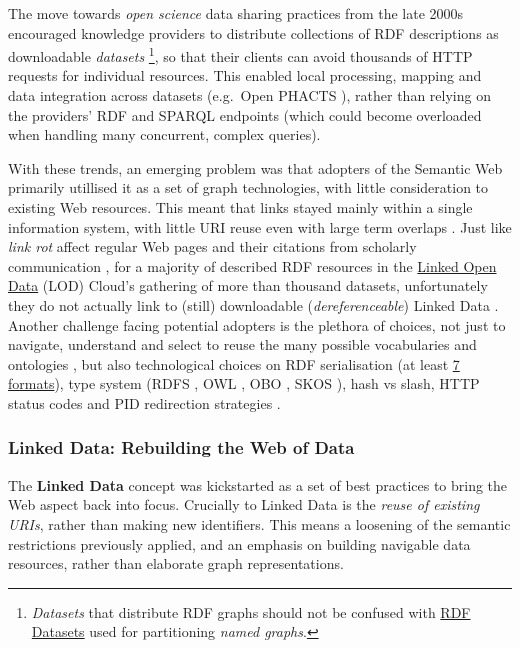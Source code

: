 \documentclass[fleqn,10pt,lineno]{wlpeerjlua}
\begin{document}
The move towards \emph{open science} data sharing practices from the late 2000s encouraged knowledge providers to distribute collections of RDF descriptions as downloadable \emph{datasets} \footnote{\emph{Datasets} that distribute RDF graphs should not be confused with \href{https://www.w3.org/TR/rdf11-concepts/\#section-dataset}{RDF Datasets} used for partitioning \emph{named graphs}.}, so that their clients can avoid thousands of HTTP requests for individual resources. This enabled local processing, mapping and data integration across datasets (e.g.~Open PHACTS \autocite{grothAPIcentricLinkedData2014b}), rather than relying on the providers' RDF and SPARQL endpoints (which could become overloaded when handling many concurrent, complex queries).

With these trends, an emerging problem was that adopters of the Semantic Web primarily utillised it as a set of graph technologies, with little consideration to existing Web resources. This meant that links stayed mainly within a single information system, with little URI reuse even with large term overlaps \autocite{kamdarSystematicAnalysisTerm2017a}. Just like \emph{link rot} affect regular Web pages and their citations from scholarly communication \autocite{kleinScholarlyContextNot2014a}, for a majority of described RDF resources in the \href{https://lod-cloud.net/}{Linked Open Data} (LOD) Cloud's gathering of more than thousand datasets, unfortunately they do not actually link to (still) downloadable (\emph{dereferenceable}) Linked Data \autocite{polleresMoreDecentralizedVision2020a}. Another challenge facing potential adopters is the plethora of choices, not just to navigate, understand and select to reuse the many possible vocabularies and ontologies \autocite{carrieroLandscapeOntologyReuse2020a}, but also technological choices on RDF serialisation (at least \href{https://www.w3.org/TR/rdf11-primer/\#section-graph-syntax}{7 formats}), type system (RDFS \autocite{w3-rdf-schema}, OWL \autocite{w3-owl2-overview}, OBO \autocite{tirmiziMappingOBOOWL2011a}, SKOS \autocite{w3-skos-primer}), hash vs slash, HTTP status codes and PID redirection strategies \autocite{sauermannCoolURIsSemantic2011}.

\hypertarget{sec:ld-web}{%
\subsubsection*{Linked Data: Rebuilding the Web of Data}\label{sec:ld-web}}

The \textbf{Linked Data} concept \autocite{bizerLinkedDataStory2009a} was kickstarted as a set of best practices \autocite{LinkedDataDesign} to bring the Web aspect back into focus. Crucially to Linked Data is the \emph{reuse of existing URIs}, rather than making new identifiers. This means a loosening of the semantic restrictions previously applied, and an emphasis on building navigable data resources, rather than elaborate graph representations.
\end{document}
